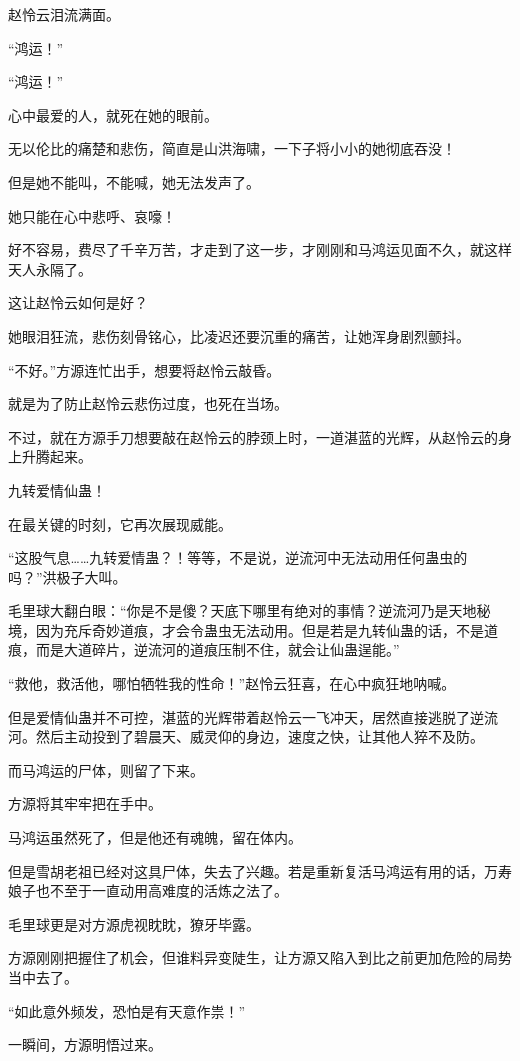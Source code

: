 \begin{this_body}
赵怜云泪流满面。

“鸿运！”

“鸿运！”

心中最爱的人，就死在她的眼前。

无以伦比的痛楚和悲伤，简直是山洪海啸，一下子将小小的她彻底吞没！

但是她不能叫，不能喊，她无法发声了。

她只能在心中悲呼、哀嚎！

好不容易，费尽了千辛万苦，才走到了这一步，才刚刚和马鸿运见面不久，就这样天人永隔了。

这让赵怜云如何是好？

她眼泪狂流，悲伤刻骨铭心，比凌迟还要沉重的痛苦，让她浑身剧烈颤抖。

“不好。”方源连忙出手，想要将赵怜云敲昏。

就是为了防止赵怜云悲伤过度，也死在当场。

不过，就在方源手刀想要敲在赵怜云的脖颈上时，一道湛蓝的光辉，从赵怜云的身上升腾起来。

九转爱情仙蛊！

在最关键的时刻，它再次展现威能。

“这股气息……九转爱情蛊？！等等，不是说，逆流河中无法动用任何蛊虫的吗？”洪极子大叫。

毛里球大翻白眼：“你是不是傻？天底下哪里有绝对的事情？逆流河乃是天地秘境，因为充斥奇妙道痕，才会令蛊虫无法动用。但是若是九转仙蛊的话，不是道痕，而是大道碎片，逆流河的道痕压制不住，就会让仙蛊逞能。”

“救他，救活他，哪怕牺牲我的性命！”赵怜云狂喜，在心中疯狂地呐喊。

但是爱情仙蛊并不可控，湛蓝的光辉带着赵怜云一飞冲天，居然直接逃脱了逆流河。然后主动投到了碧晨天、威灵仰的身边，速度之快，让其他人猝不及防。

而马鸿运的尸体，则留了下来。

方源将其牢牢把在手中。

马鸿运虽然死了，但是他还有魂魄，留在体内。

但是雪胡老祖已经对这具尸体，失去了兴趣。若是重新复活马鸿运有用的话，万寿娘子也不至于一直动用高难度的活炼之法了。

毛里球更是对方源虎视眈眈，獠牙毕露。

方源刚刚把握住了机会，但谁料异变陡生，让方源又陷入到比之前更加危险的局势当中去了。

“如此意外频发，恐怕是有天意作祟！”

一瞬间，方源明悟过来。


\end{this_body}
